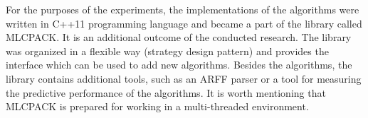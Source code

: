 For the purposes of the experiments, the implementations of the algorithms were written in C++11 programming language and became a part of the library called MLCPACK. It is an additional outcome of the conducted research. The library was organized in a flexible way (strategy design pattern) and provides the interface which can be used to add new algorithms. Besides the algorithms, the library contains additional tools, such as an ARFF parser or a tool for measuring the predictive performance of the algorithms. It is worth mentioning that MLCPACK is prepared for working in a multi-threaded environment.
